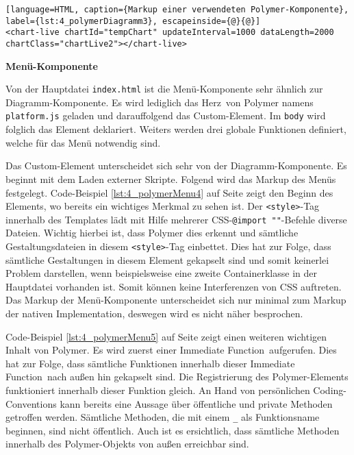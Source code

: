 \begin{lstlisting}[language=HTML, caption={Markup einer verwendeten Polymer-Komponente}, label={lst:4_polymerDiagramm3}, escapeinside={@}{@}]
<chart-live chartId="tempChart" updateInterval=1000 dataLength=2000 chartClass="chartLive2"></chart-live>
\end{lstlisting}





\textbf{Menü-Komponente}

Von der Hauptdatei \lstinline|index.html| ist die Menü-Komponente sehr ähnlich zur Diagramm-Komponente. Es wird lediglich das \glqq Herz\grqq\ von Polymer namens \lstinline|platform.js| geladen und darauffolgend das Custom-Element. Im \lstinline|body| wird folglich das Element deklariert. Weiters werden drei globale Funktionen definiert, welche für das Menü notwendig sind.

Das Custom-Element unterscheidet sich sehr von der Diagramm-Komponente. Es beginnt mit dem Laden externer Skripte. Folgend wird das Markup des Menüs festgelegt. Code-Beispiel \ref{lst:4_polymerMenu4} auf Seite \pageref{lst:4_polymerMenu4} zeigt den Beginn des Elements, wo bereits ein wichtiges Merkmal zu sehen ist. Der \lstinline|<style>|-Tag innerhalb des Templates lädt mit Hilfe mehrerer CSS-\lstinline|@import ""|-Befehle diverse Dateien. Wichtig hierbei ist, dass Polymer dies erkennt und sämtliche Gestaltungsdateien in diesem \lstinline|<style>|-Tag einbettet. Dies hat zur Folge, dass sämtliche Gestaltungen in diesem Element gekapselt sind und somit keinerlei Problem darstellen, wenn beispielsweise eine zweite Containerklasse in der Hauptdatei vorhanden ist. Somit können keine Interferenzen von CSS auftreten. Das Markup der Menü-Komponente unterscheidet sich nur minimal zum Markup der nativen Implementation, deswegen wird es nicht näher besprochen.

Code-Beispiel \ref{lst:4_polymerMenu5} auf Seite \pageref{lst:4_polymerMenu5} zeigt einen weiteren wichtigen Inhalt von Polymer. Es wird zuerst einer \glqq Immediate Function\grqq\ aufgerufen. Dies hat zur Folge, dass sämtliche Funktionen innerhalb dieser \glqq Immediate Function\grqq\ nach außen hin gekapselt sind. Die Registrierung des Polymer-Elements funktioniert innerhalb dieser Funktion gleich. An Hand von persönlichen Coding-Conventions kann bereits eine Aussage über öffentliche und private Methoden getroffen werden. Sämtliche Methoden, die mit einem \lstinline|_| als Funktionsname beginnen, sind nicht öffentlich. Auch ist es ersichtlich, dass sämtliche Methoden innerhalb des Polymer-Objekts von außen erreichbar sind.






